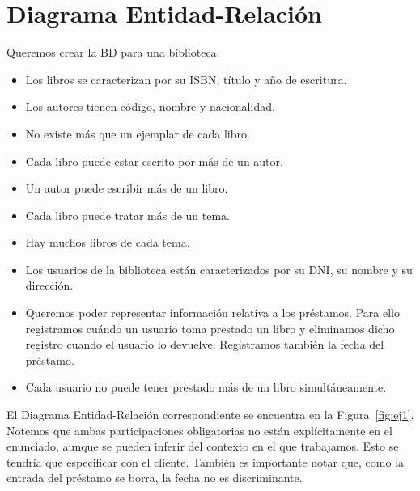 \section{Diagrama Entidad-Relación}

\begin{ejercicio} \label{ej:1}
    Queremos crear la BD para una biblioteca:
    \begin{itemize}
        \item Los libros se caracterizan por su ISBN, título y año de escritura.
        \item Los autores tienen código, nombre y nacionalidad.
        \item No existe más que un ejemplar de cada libro.
        \item Cada libro puede estar escrito por más de un autor.
        \item Un autor puede escribir más de un libro.
        \item Cada libro puede tratar más de un tema.
        \item Hay muchos libros de cada tema.
        \item Los usuarios de la biblioteca están caracterizados por su DNI, su nombre y su dirección.
        \item Queremos poder representar información relativa a los préstamos. Para ello registramos cuándo un usuario toma prestado un libro y eliminamos dicho registro cuando el usuario lo devuelve. Registramos también la fecha del préstamo.
        \item Cada usuario no puede tener prestado más de un libro simultáneamente.
    \end{itemize}
    
    El Diagrama Entidad-Relación correspondiente se encuentra en la Figura~\ref{fig:ej1}.
    Notemos que ambas participaciones obligatorias no están explícitamente en el enunciado,
    aunque se pueden inferir del contexto en el que trabajamos. Esto se tendría que especificar con el cliente.
    También es importante notar que, como la entrada del préstamo se borra, la fecha no es discriminante. 
    \begin{figure}
        \centering
\end{figure}
\end{ejercicio}
